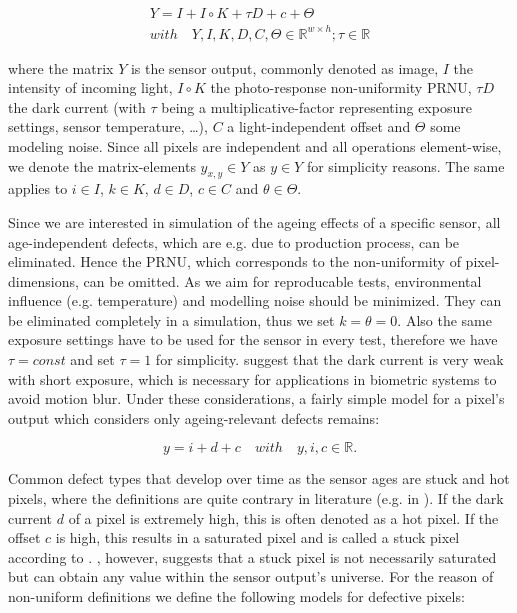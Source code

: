 \documentclass[10pt,twocolumn,letterpaper]{article}
\begin{document}
\begin{equation}
\begin{aligned}
 Y = I+I \circ K+\tau D +c+\Theta \\ with \quad Y,I,K,D,C, \Theta \in \mathbb{R}^{w \times h}; \tau \in \mathbb{R}
\end{aligned}
  \label{equ:pixelmodel}
 \end{equation}

where the matrix $Y$ is the sensor output, commonly denoted as image, $I$ the intensity of incoming light, $I \circ K$ the photo-response non-uniformity PRNU, $\tau D$ the dark current (with $\tau$ being a multiplicative-factor representing exposure settings, sensor temperature, \dots), $C$ a light-independent offset and $\Theta$ some modeling noise. Since all pixels are independent \cite{fridrich, defectDetection} and all operations element-wise, we denote the matrix-elements $y_{x,y} \in Y$ as $ y \in Y$ for simplicity reasons. The same applies to $i \in I$, $k \in K$, $d \in D$, $c \in C$ and $\theta \in \Theta$.

Since we are interested in simulation of the ageing effects of a specific sensor, all age-independent defects, which are e.g. due to production process, can be eliminated. Hence the PRNU, which corresponds to the non-uniformity of pixel-dimensions, can be omitted. As we aim for reproducable tests, environmental influence (e.g. temperature) and modelling noise should be minimized. They can be eliminated completely in a simulation, thus we set $k=\theta=0$. Also the same exposure settings have to be used for the sensor in every test, therefore we have $\tau = const$ and set $ \tau = 1$ for simplicity. \cite{camAndDisplays, radiometricCCD,failureSemi,fridrich} suggest that the dark current is very weak with short exposure, which is necessary for applications in biometric systems to avoid motion blur. Under these considerations, a fairly simple model for a pixel's output which considers only ageing-relevant defects remains:

\begin{equation}
  \label{equ:pixemodelEasier}
  y = i + d + c \quad with \quad y,i,c \in \mathbb{R}.
\end{equation}

Common defect types that develop over time as the sensor ages are stuck and hot pixels, where the definitions are quite contrary in literature (e.g. in \cite{fridrich, defectIdentification, failureSemi}). If the dark current $d$ of a pixel is extremely high, this is often denoted as a hot pixel. If the offset $c$ is high, this results in a saturated pixel and is called a stuck pixel according to \cite{fridrich}. \cite{defectIdentification}, however, suggests that a stuck pixel is not necessarily saturated but can obtain any value within the sensor output's universe. For the reason of non-uniform definitions we define the following models for defective pixels:
\end{document}

